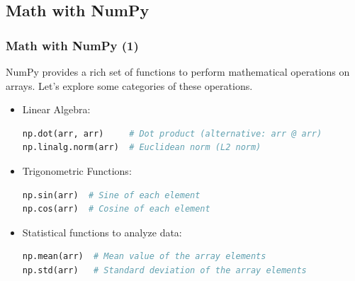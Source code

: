 \subsection{Math with NumPy}
\begin{frame}[fragile]
  \frametitle{Math with NumPy (1)}
  NumPy provides a rich set of functions to perform mathematical operations on arrays. Let's explore some categories of these operations.
  \begin{itemize}
    \item Linear Algebra:
    \begin{lstlisting}[language=Python, numbers=none]
np.dot(arr, arr)     # Dot product (alternative: arr @ arr)
np.linalg.norm(arr)  # Euclidean norm (L2 norm)
    \end{lstlisting}\pause
    
    \item Trigonometric Functions:
  \begin{lstlisting}[language=Python, numbers=none]
np.sin(arr)  # Sine of each element
np.cos(arr)  # Cosine of each element
  \end{lstlisting}
  
  \item Statistical functions to analyze data:
  \begin{lstlisting}[language=Python, numbers=none]
np.mean(arr)  # Mean value of the array elements
np.std(arr)   # Standard deviation of the array elements
  \end{lstlisting}
\end{itemize}
\end{frame}


